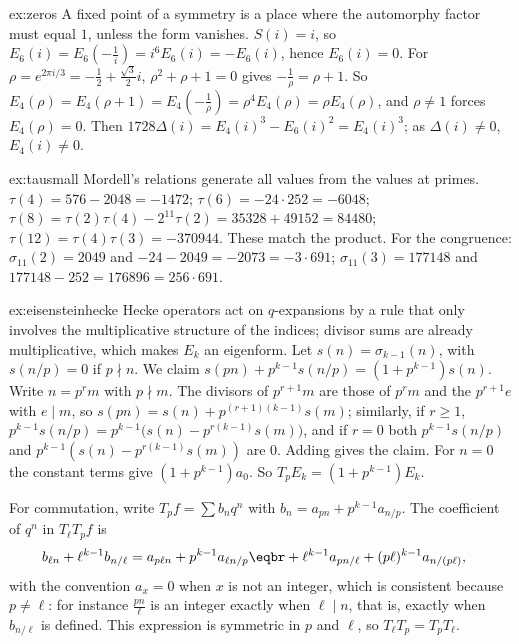 \begin{solution}{ex:zeros}
\idea A fixed point of a symmetry is a place where the automorphy factor must equal $1$, unless the form vanishes.
\writeup $S(i)=i$, so $E_6(i)=E_6(-\frac1i)=i^6E_6(i)=-E_6(i)$, hence $E_6(i)=0$. For $\rho=e^{2\pi i/3}=-\frac12+\frac{\sqrt3}2i$, $\rho^2+\rho+1=0$ gives $-\frac1\rho=\rho+1$. So
$E_4(\rho)=E_4(\rho+1)=E_4(-\frac1\rho)=\rho^4E_4(\rho)=\rho E_4(\rho)$, and $\rho\ne1$ forces $E_4(\rho)=0$. Then $1728\Delta(i)=E_4(i)^3-E_6(i)^2=E_4(i)^3$; as $\Delta(i)\ne0$, $E_4(i)\ne0$.
\end{solution}

\begin{solution}{ex:tausmall}
\idea Mordell's relations generate all values from the values at primes.
\writeup $\tau(4)=576-2048=-1472$; $\tau(6)=-24\cdot252=-6048$; $\tau(8)=\tau(2)\tau(4)-2^{11}\tau(2)=35328+49152=84480$; $\tau(12)=\tau(4)\tau(3)=-370944$. These match the product. For the congruence:
$\sigma_{11}(2)=2049$ and $-24-2049=-2073=-3\cdot691$; $\sigma_{11}(3)=177148$ and $177148-252=176896=256\cdot691$.
\end{solution}

\begin{solution}{ex:eisensteinhecke}
\idea Hecke operators act on $q$-expansions by a rule that only involves the multiplicative structure of the indices; divisor sums are already multiplicative, which makes $E_k$ an eigenform.
\writeup Let $s(n)=\sigma_{k-1}(n)$, with $s(n/p)=0$ if $p\nmid n$. We claim $s(pn)+p^{k-1}s(n/p)=(1+p^{k-1})s(n)$. Write $n=p^rm$ with $p\nmid m$. The divisors of $p^{r+1}m$ are those of $p^rm$ and the $p^{r+1}e$ with $e\mid m$, so
$s(pn)=s(n)+p^{(r+1)(k-1)}s(m)$; similarly, if $r\ge1$, $p^{k-1}s(n/p)=p^{k-1}\bigl(s(n)-p^{r(k-1)}s(m)\bigr)$, and if $r=0$ both $p^{k-1}s(n/p)$ and $p^{k-1}(s(n)-p^{r(k-1)}s(m))$ are $0$. Adding gives the claim. For $n=0$
the constant terms give $(1+p^{k-1})a_0$. So $T_pE_k=(1+p^{k-1})E_k$.

For commutation, write $T_pf=\sum b_nq^n$ with $b_n=a_{pn}+p^{k-1}a_{n/p}$. The coefficient of $q^n$ in $T_\ell T_pf$ is
\[
\begin{aligned}b_{\ell n}+\ell^{k-1}b_{n/\ell}&=a_{p\ell n}+p^{k-1}a_{\ell n/p}\eqbr+\ell^{k-1}a_{pn/\ell}+(p\ell)^{k-1}a_{n/(p\ell)},\end{aligned}
\]
with the convention $a_x=0$ when $x$ is not an integer, which is consistent because $p\ne\ell$: for instance $\frac{pn}\ell$ is an integer exactly when $\ell\mid n$, that is, exactly when $b_{n/\ell}$ is defined.
This expression is symmetric in $p$ and $\ell$, so $T_\ell T_p=T_pT_\ell$.
\end{solution}

